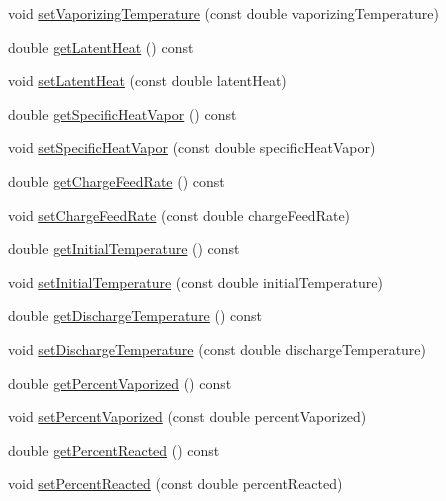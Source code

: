 \begin{DoxyCompactItemize}
\item 
void \hyperlink{class_liquid_load_charge_material_a50938e3270de5d3c59b872f290a761cc}{set\+Vaporizing\+Temperature} (const double vaporizing\+Temperature)
\item 
double \hyperlink{class_liquid_load_charge_material_aca3a38eb3343144042e9349b053da1bc}{get\+Latent\+Heat} () const
\item 
void \hyperlink{class_liquid_load_charge_material_a01d2d23580f27aa9e5cba1124635a677}{set\+Latent\+Heat} (const double latent\+Heat)
\item 
double \hyperlink{class_liquid_load_charge_material_ac4538f9722bf25465ec86586469a7b1e}{get\+Specific\+Heat\+Vapor} () const
\item 
void \hyperlink{class_liquid_load_charge_material_ae95faf01cf6293ab282b1b7fe3b849e1}{set\+Specific\+Heat\+Vapor} (const double specific\+Heat\+Vapor)
\item 
double \hyperlink{class_liquid_load_charge_material_af818c541527b3b28a8f84a08dc0c884e}{get\+Charge\+Feed\+Rate} () const
\item 
void \hyperlink{class_liquid_load_charge_material_a23d6aa6f15a124ddb1504261347b0b82}{set\+Charge\+Feed\+Rate} (const double charge\+Feed\+Rate)
\item 
double \hyperlink{class_liquid_load_charge_material_ab80229a78f884fb07e756665a616d401}{get\+Initial\+Temperature} () const
\item 
void \hyperlink{class_liquid_load_charge_material_ac30600ef82db69934e8c08e4a774bb03}{set\+Initial\+Temperature} (const double initial\+Temperature)
\item 
double \hyperlink{class_liquid_load_charge_material_ad474f33059c99aa94e1d63738e11ff0e}{get\+Discharge\+Temperature} () const
\item 
void \hyperlink{class_liquid_load_charge_material_a04ef0778e524f531b6dd2dd6137c270d}{set\+Discharge\+Temperature} (const double discharge\+Temperature)
\item 
double \hyperlink{class_liquid_load_charge_material_a8e55b0df0a0551671636bcf169228dca}{get\+Percent\+Vaporized} () const
\item 
void \hyperlink{class_liquid_load_charge_material_aaf2aa3303201370a7b79e5b3f54e135a}{set\+Percent\+Vaporized} (const double percent\+Vaporized)
\item 
double \hyperlink{class_liquid_load_charge_material_acfedb26800cbead9bf11c57e1356dd57}{get\+Percent\+Reacted} () const
\item 
void \hyperlink{class_liquid_load_charge_material_a9984b8c78a460ef3569fc3ef13eea604}{set\+Percent\+Reacted} (const double percent\+Reacted)

\end{DoxyCompactItemize}
